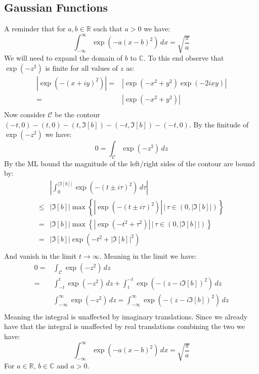 \documentclass[12pt]{report}
\begin{document}
\subsection{Gaussian Functions}
A reminder that for $a,b \in \mathbb{R}$ such that $a > 0$ we have:
\[\int_{-\infty}^{\infty}\exp(-a(x-b)^2)\,dx = \sqrt{\frac{\pi}{a}}\]
We will need to expand the domain of $b$ to $\mathbb{{C}}$.
To this end observe that $\exp(-z^2)$ is finite for all values of $z$ as:
\begin{equation*}
\begin{aligned}
	|\exp(-(x+iy)^2)| =& |\exp(-x^2+y^2)\exp(-2ixy)|\\
	=& |\exp(-x^2+y^2)| \\
\end{aligned}
\end{equation*}
Now consider $\mathcal{C}$ be the contour $(-t,0)-(t,0)-(t,\Im[b])-(-t,\Im[b])-(-t,0)$.
By the finitude of $\exp(-z^2)$ we have:
\[0 = \int_\mathcal{C}\exp(-z^2)\,dz \]
By the ML bound the magnitude of the left/right sides of the contour are bound by:
\begin{equation*}
\begin{aligned}
	&\left|\int_{0}^{|\Im[b]|}\exp(-(t\pm i\tau)^2)\,d\tau\right|\\
	\leq&|\Im[b]|\max\left\{|\exp(-(t\pm i\tau)^2)|\,\bigg|\,\tau \in (0,|\Im[b]|)\right\}\\
	=&|\Im[b]|\max\left\{|\exp(-t^2 +\tau^2)|\,\bigg|\,\tau \in (0,|\Im[b]|)\right\}\\
	=&|\Im[b]|\exp(-t^2 +|\Im[b]|^2)\\
\end{aligned}
\end{equation*}
And vanish in the limit $t\rightarrow \infty$.
Meaning in the limit we have:
\begin{equation*}
\begin{aligned}
	0 =& \int_\mathcal{C}\exp(-z^2)\,dz \\
	=& \int_{-t}^{t}\exp(-z^2)\,dz + \int_{t}^{-t}\exp(-(z-i\Im[b])^2)\,dz \\
	&\int_{-\infty}^{\infty}\exp(-z^2)\,dz = \int_{-\infty}^{\infty}\exp(-(z-i\Im[b])^2)\,dz \\
\end{aligned}
\end{equation*}
Meaning the integral is unaffected by imaginary translations.
Since we already have that the integral is unaffected by real translations combining the two we have:
\[\int_{-\infty}^{\infty}\exp(-a(x-b)^2)\,dx = \sqrt{\frac{\pi}{a}}\]
For $a \in \mathbb{R}$, $b \in \mathbb{C}$ and $a > 0$.
\\
\end{document}

